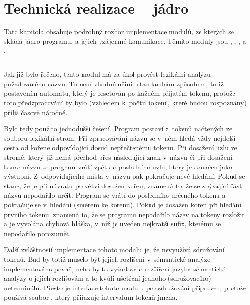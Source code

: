 \chapter{Technická realizace -- jádro}
Tato kapitola obsahuje podrobný rozbor implementace modulů, ze kterých se skládá
jádro programu, a jejich vzájemné komunikace. Těmito moduly jsou
, , ,  a
.

\section{}
Jak již bylo řečeno, tento modul má za úkol provést lexikální analýzu
po\-ža\-do\-va\-né\-ho názvu. To není vhodné učinit standardním způsobem, totiž po\-sta\-ve\-ním
automatu, který je resetován po každém přijatém tokenu, protože toto
předzpracování by bylo (vzhledem k~počtu tokenů, které budou rozpoznány) příliš
časově náročné.

Bylo tedy použito jednodušší řešení. Program postaví z~tokenů načtených ze
souboru  lexikální strom. Při zpracovávání názvu se v~něm hledá
vždy nejdelší cesta od kořene odpovídající dosud nepřečtenému tokenu. Při
dosažení uzlu ve stromě, který již nemá přechod přes následující znak v~názvu či
při dosažení konce názvu se program vrátí zpět do posledního uzlu, který je
označen jako výstupní. Z~odpovídajícího místa v~názvu pak pokračuje nové hledání.
Pokud se stane, že je při návratu po větvi dosažen kořen, znamená to, že se
zbývající část názvu nepodařilo určit. Program se vrátí do posledního určeného
tokenu a pokračuje se v~hledání (směrem ke kořenu). Pokud je dosažen kořen při
hledání prvního tokenu, znamená to, že se programu nepodařilo název na tokeny
rozložit a je vyvolána chybová hláška, v~níž je uveden nejkratší sufix, kterému
se nepodařilo porozumět.

Další zvláštností implementace tohoto modulu je, že nevyužívá sdru\-žo\-vá\-ní tokenů.
Buď by totiž muselo být jejich rozlišení v~sémantické analýze implementováno
pevně, nebo by to vyžadovalo rozšíření jazyka sémantické analýzy o jejich
rozlišování a to kvůli ušetření jednoho (sdružovacího) neterminálu. Přesto je
interface tohoto modulu pro sdružování připraven, protože používá soubor
, který přiřazuje intervalům tokenů jména.

